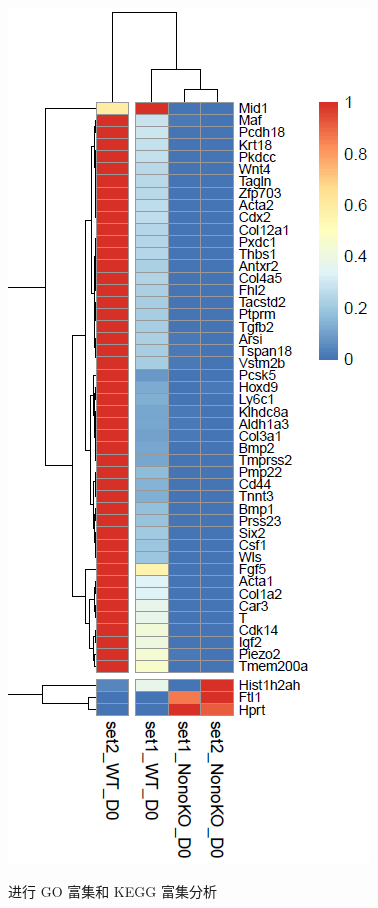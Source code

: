 \documentclass[
  a4paper,
]{article}
\begin{document}
\includegraphics{assets/Snipaste_2022-10-26_09-44-43-20221026094454-yjonve6.png}\hspace{0pt}

\hspace{0pt}

进行 GO 富集和 KEGG 富集分析
\end{document}
